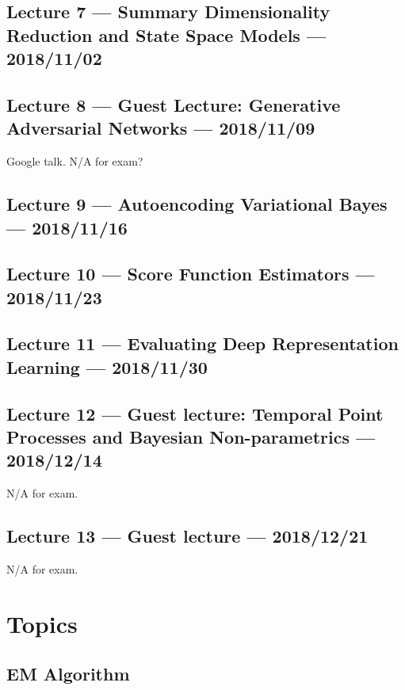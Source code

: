 \documentclass{article}
\begin{document}
\subsection{Lecture 7 --- Summary Dimensionality Reduction and State Space Models --- 2018/11/02}

\subsection{Lecture 8 --- Guest Lecture: Generative Adversarial Networks --- 2018/11/09}

Google talk. N/A for exam?

\subsection{Lecture 9 --- Autoencoding Variational Bayes --- 2018/11/16}

\subsection{Lecture 10 --- Score Function Estimators --- 2018/11/23}

\subsection{Lecture 11 --- Evaluating Deep Representation Learning --- 2018/11/30}

\subsection{Lecture 12 --- Guest lecture: Temporal Point Processes and Bayesian Non-parametrics --- 2018/12/14}

N/A for exam.

\subsection{Lecture 13 --- Guest lecture --- 2018/12/21}

N/A for exam.







\section{Topics}



\subsection{EM Algorithm}
\end{document}
